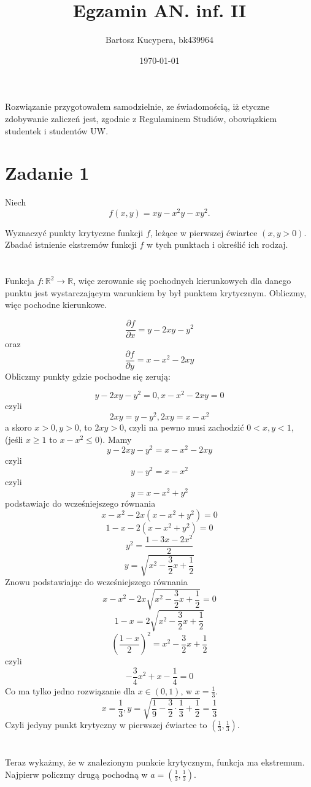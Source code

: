 \documentclass{article}
\title{Egzamin AN. inf. II}
\author{Bartosz Kucypera, bk439964}
\date{\today}
\begin{document}
\maketitle

Rozwiązanie przygotowałem samodzielnie, ze świadomością, iż etyczne zdobywanie zaliczeń jest, zgodnie z Regulaminem Studiów, obowiązkiem studentek i studentów UW.

\section*{Zadanie 1}
Niech 
$$ f(x,y) = xy -x^2y - xy^2.$$

Wyznaczyć punkty krytyczne funkcji $f$, leżące w pierwszej ćwiartce $(x, y > 0)$. Zbadać istnienie ekstremów funkcji $f$ w tych punktach i określić ich rodzaj.

\section*{}
Funkcja $f:\mathbb{R}^2 \to \mathbb{R}$, więc zerowanie się pochodnych kierunkowych dla danego punktu jest wystarczającym warunkiem by był punktem krytycznym. Obliczmy, więc pochodne kierunkowe.

$$\frac{\partial f}{\partial x} = y- 2xy -y^2$$ 
oraz 
$$\frac{\partial f}{\partial y} = x - x^2 -2xy$$
Obliczmy punkty gdzie pochodne się zerują:

$$y-2xy -y^2 = 0, x-x^2-2xy = 0$$
czyli 
$$2xy = y-y^2, 2xy = x-x^2 $$
a skoro $x > 0, y > 0$, to $2xy > 0$, czyli na pewno musi zachodzić $0 < x, y < 1$, (jeśli $x \ge 1$ to $x-x^2 \le 0)$. \newline
Mamy 
$$ y-2xy -y^2 = x-x^2-2xy$$
czyli 
$$ y-y^2 = x-x^2$$
czyli 
$$y = x-x^2 + y^2 $$
podstawiajc do wcześniejszego równania
$$x - x^2 -2x(x-x^2 + y^2) = 0$$
$$1 - x -2(x-x^2 + y^2) = 0$$
$$ y^2 = \frac{1 - 3x - 2x^2}{2} $$
$$y = \sqrt{x^2 - \frac{3}{2}x + \frac{1}{2}}$$
\newpage
Znowu podstawiając do wcześniejszego równania
$$ x-x^2 -2x\sqrt{x^2 - \frac{3}{2}x + \frac{1}{2}} = 0$$
$$1 - x = 2 \sqrt{x^2 - \frac{3}{2}x + \frac{1}{2}}$$
$$\left(\frac{1-x}{2}\right)^2 = x^2 - \frac{3}{2}x + \frac{1}{2}$$
czyli
$$ -\frac{3}{4}x^2 + x - \frac{1}{4} = 0$$
Co ma tylko jedno rozwiązanie dla $x \in (0, 1)$, w $x = \frac{1}{3}$.
$$ x = \frac{1}{3}, y = \sqrt{\frac{1}{9} - \frac{3}{2}\cdot\frac{1}{3} + \frac{1}{2}} = \frac{1}{3} $$
Czyli jedyny punkt krytyczny w pierwszej ćwiartce to $(\frac{1}{3}, \frac{1}{3})$.
\section*{}
Teraz wykażmy, że w znalezionym punkcie krytycznym, funkcja ma ekstremum. \newline
Najpierw policzmy drugą pochodną w $a = (\frac{1}{3}, \frac{1}{3})$. 
\end{document}

